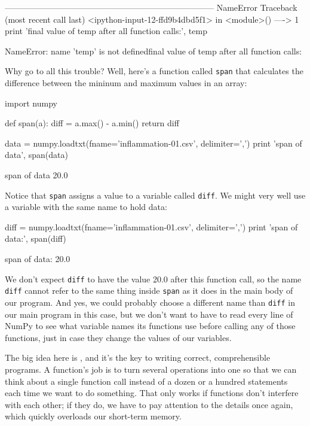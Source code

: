 \documentclass{book}
\begin{document}
\begin{VerbErr}
---------------------------------------------------------------------------
NameError                                 Traceback (most recent call last)
<ipython-input-12-ffd9b4dbd5f1> in <module>()
----> 1 print 'final value of temp after all function calls:', temp

NameError: name 'temp' is not definedfinal value of temp after all function calls:
\end{VerbErr}

Why go to all this trouble? Well, here's a function called \texttt{span}
that calculates the difference between the mininum and maximum values in
an array:

\begin{VerbIn}
import numpy

def span(a):
    diff = a.max() - a.min()
    return diff

data = numpy.loadtxt(fname='inflammation-01.csv', delimiter=',')
print 'span of data', span(data)
\end{VerbIn}

\begin{VerbOut}
 span of data 20.0
\end{VerbOut}

Notice that \texttt{span} assigns a value to a variable called
\texttt{diff}. We might very well use a variable with the same name to
hold data:

\begin{VerbIn}
diff = numpy.loadtxt(fname='inflammation-01.csv', delimiter=',')
print 'span of data:', span(diff)
\end{VerbIn}

\begin{VerbOut}
span of data: 20.0
\end{VerbOut}

We don't expect \texttt{diff} to have the value 20.0 after this function
call, so the name \texttt{diff} cannot refer to the same thing inside
\texttt{span} as it does in the main body of our program. And yes, we
could probably choose a different name than \texttt{diff} in our main
program in this case, but we don't want to have to read every line of
NumPy to see what variable names its functions use before calling any of
those functions, just in case they change the values of our variables.

The big idea here is , and it's
the key to writing correct, comprehensible programs. A function's job is
to turn several operations into one so that we can think about a single
function call instead of a dozen or a hundred statements each time we
want to do something. That only works if functions don't interfere with
each other; if they do, we have to pay attention to the details once
again, which quickly overloads our short-term memory.
\end{document}
